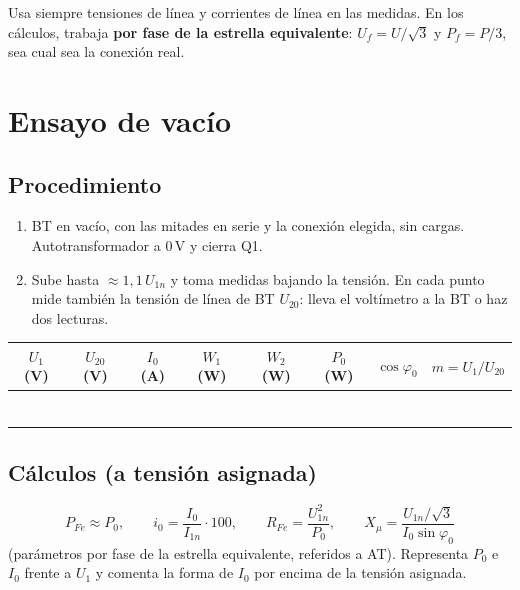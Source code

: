 \documentclass[11pt,a4paper]{article}
\begin{document}
\begin{nota}
  Usa siempre tensiones de línea y corrientes de línea en las medidas. En los cálculos, trabaja \textbf{por fase de la estrella equivalente}: $U_f = U/\sqrt3$ y $P_f = P/3$, sea cual sea la conexión real.
\end{nota}

\section{Ensayo de vacío}
\subsection*{Procedimiento}
\begin{enumerate}
  \item BT en vacío, con las mitades en serie y la conexión elegida, sin cargas. Autotransformador a 0\,V y cierra Q1.
  \item Sube hasta $\approx 1{,}1\,U_{1n}$ y toma medidas bajando la tensión. En cada punto mide también la tensión de línea de BT $U_{20}$: lleva el voltímetro a la BT o haz dos lecturas.
\end{enumerate}

\begin{tabularx}{\textwidth}{|C|C|C|C|C|C|C|C|}
  \hline
  $U_{1}$ (V) & $U_{20}$ (V) & $I_0$ (A) & $W_1$ (W) & $W_2$ (W) & $P_0$ (W) & $\cos\varphi_0$ & $m = U_1/U_{20}$ \\ \hline
   & & & & & & & \\[5pt] \hline
   & & & & & & & \\[5pt] \hline
   & & & & & & & \\[5pt] \hline
   & & & & & & & \\[5pt] \hline
   & & & & & & & \\[5pt] \hline
   & & & & & & & \\[5pt] \hline
   & & & & & & & \\[5pt] \hline
\end{tabularx}

\subsection*{Cálculos (a tensión asignada)}
\[
  P_{Fe} \approx P_0, \qquad
  i_0 = \frac{I_0}{I_{1n}}\cdot 100, \qquad
  R_{Fe} = \frac{U_{1n}^2}{P_0}, \qquad
  X_\mu = \frac{U_{1n}/\sqrt3}{I_0\sin\varphi_0}
\]
(parámetros por fase de la estrella equivalente, referidos a AT). Representa $P_0$ e $I_0$ frente a $U_1$ y comenta la forma de $I_0$ por encima de la tensión asignada.
\end{document}
